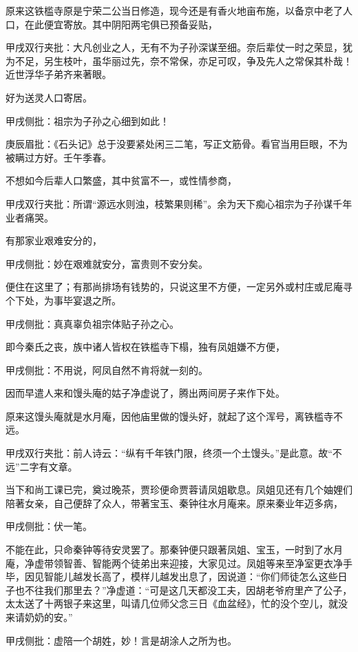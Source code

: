 \begin{parag}


    原来这铁槛寺原是宁荣二公当日修造，现今还是有香火地亩布施，以备京中老了人口，在此便宜寄放。其中阴阳两宅俱已预备妥贴，\begin{note}甲戌双行夹批：大凡创业之人，无有不为子孙深谋至细。奈后辈仗一时之荣显，犹为不足，另生枝叶，虽华丽过先，奈不常保，亦足可叹，争及先人之常保其朴哉！近世浮华子弟齐来著眼。\end{note}好为送灵人口寄居。\begin{note}甲戌侧批：祖宗为子孙之心细到如此！\end{note}\begin{note}庚辰眉批：《石头记》总于没要紧处闲三二笔，写正文筋骨。看官当用巨眼，不为被瞒过方好。壬午季春。\end{note}不想如今后辈人口繁盛，其中贫富不一，或性情参商，\begin{note}甲戌双行夹批：所谓“源远水则浊，枝繁果则稀”。余为天下痴心祖宗为子孙谋千年业者痛哭。\end{note}有那家业艰难安分的，\begin{note}甲戌侧批：妙在艰难就安分，富贵则不安分矣。\end{note}便住在这里了；有那尚排场有钱势的，只说这里不方便，一定另外或村庄或尼庵寻个下处，为事毕宴退之所。\begin{note}甲戌侧批：真真辜负祖宗体贴子孙之心。\end{note}即今秦氏之丧，族中诸人皆权在铁槛寺下榻，独有凤姐嫌不方便，\begin{note}甲戌侧批：不用说，阿凤自然不肯将就一刻的。\end{note}因而早遣人来和馒头庵的姑子净虚说了，腾出两间房子来作下处。
\end{parag}


\begin{parag}


    原来这馒头庵就是水月庵，因他庙里做的馒头好，就起了这个浑号，离铁槛寺不远。\begin{note}甲戌双行夹批：前人诗云：“纵有千年铁门限，终须一个土馒头。”是此意。故“不远”二字有文章。\end{note}当下和尚工课已完，奠过晚茶，贾珍便命贾蓉请凤姐歇息。凤姐见还有几个妯娌们陪著女亲，自己便辞了众人，带著宝玉、秦钟往水月庵来。原来秦业年迈多病，\begin{note}甲戌侧批：伏一笔。\end{note}不能在此，只命秦钟等待安灵罢了。那秦钟便只跟著凤姐、宝玉，一时到了水月庵，净虚带领智善、智能两个徒弟出来迎接，大家见过。凤姐等来至净室更衣净手毕，因见智能儿越发长高了，模样儿越发出息了，因说道：“你们师徒怎么这些日子也不往我们那里去？”净虚道：“可是这几天都没工夫，因胡老爷府里产了公子，太太送了十两银子来这里，叫请几位师父念三日《血盆经》，忙的没个空儿，就没来请奶奶的安。”\begin{note}甲戌侧批：虚陪一个胡姓，妙！言是胡涂人之所为也。\end{note}
\end{parag}


